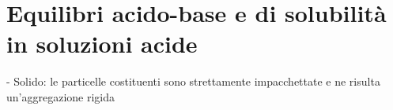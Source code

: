 \section{Equilibri acido-base e di solubilità in soluzioni acide}
- Solido: le particelle costituenti sono strettamente impacchettate e ne risulta un'aggregazione rigida
